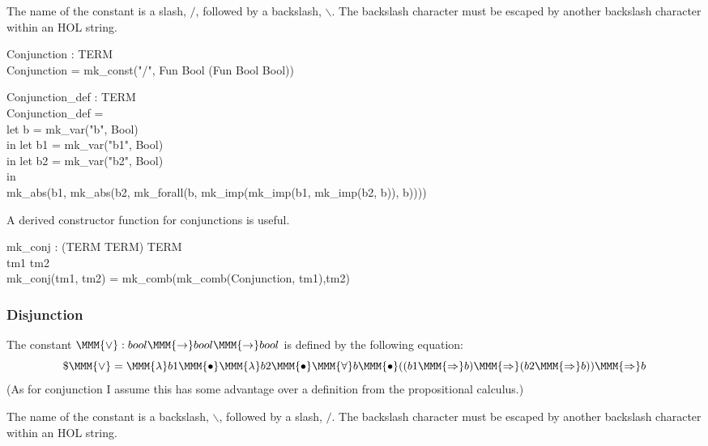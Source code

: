 \documentclass[a4paper,11pt,titlepage]{article}
\begin{document}
\begin{titlepage}
The name of the constant is a slash, $/$, followed by a
backslash, $\backslash$. The backslash character
must be escaped by another backslash character within
an HOL string.
\begin{HOLConst}
\+	\PrNL{}Conjunction\PrNN{} : TERM\\
\PrPH{}
\+	Conjunction = mk\_const("/\Backslash{}\Backslash{}", Fun Bool (Fun Bool Bool))\\
\end{HOLConst}
\begin{HOLConst}
\+	\PrNL{}Conjunction\_def\PrNN{} : TERM\\
\PrPH{}
\+	Conjunction\_def =\\
\+	let b = mk\_var("b", Bool)\\
\+	in let b1 = mk\_var("b1", Bool)\\
\+	in let b2 = mk\_var("b2", Bool)\\
\+	in\\
\+	mk\_abs(b1, mk\_abs(b2, mk\_forall(b, mk\_imp(mk\_imp(b1, mk\_imp(b2, b)), b))))\\
\end{HOLConst}
A derived constructor function for conjunctions is
useful.
\begin{HOLConst}
\+	\PrNL{}mk\_conj\PrNN{} : (TERM \MMM{\times} TERM) \MMM{\rightarrow} TERM\\
\PrPH{}
\+	\MMM{\forall} tm1 tm2\MMM{\bullet}\\
\+	mk\_conj(tm1, tm2) = mk\_comb(mk\_comb(Conjunction, tm1),tm2)\\
\end{HOLConst}

\subsubsection{Disjunction}
The constant $\MMM{\lor}: bool \MMM{\rightarrow} bool \MMM{\rightarrow} bool$
is defined by the following equation:
$$\$\MMM{\lor} = \MMM{\lambda}b1\MMM{\bullet}\MMM{\lambda}b2\MMM{\bullet}\MMM{\forall}b\MMM{\bullet}((b1 \MMM{\Rightarrow} b) \MMM{\Rightarrow} (b2 \MMM{\Rightarrow} b)) \MMM{\Rightarrow} b$$
(As for conjunction I assume this has some advantage
over a definition from the propositional calculus.)

The name of the constant is a
backslash, $\backslash$, followed by a slash, $/$.
The backslash character
must be escaped by another backslash character within
an HOL string.


\end{titlepage}
\end{document}
